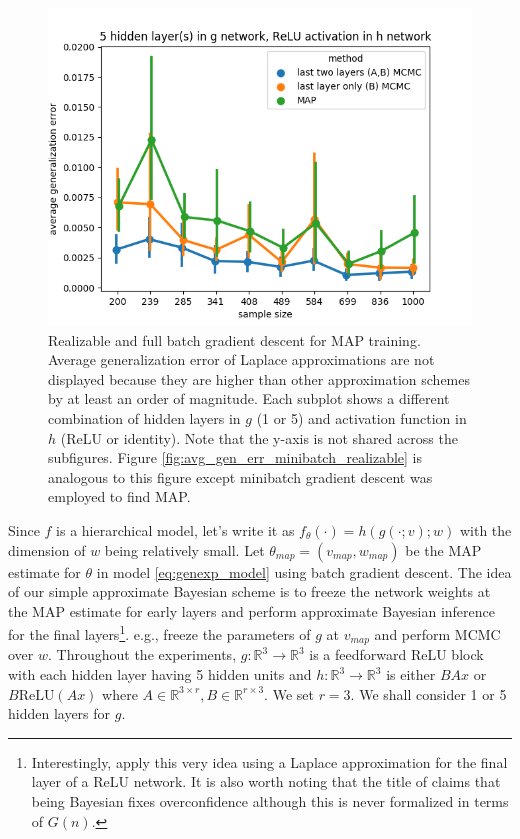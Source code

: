\documentclass{article} %
\begin{document}
\begin{figure}[h!]
\begin{center}
		\includegraphics[scale=0.4]{taskid11.png}
	\end{center}
	\caption{Realizable and full batch gradient descent for MAP training. Average generalization error of Laplace approximations are not displayed because they are higher than other approximation schemes by at least an order of magnitude. Each subplot shows a different combination of hidden layers in $g$ (1 or 5) and activation function in $h$ (ReLU or identity). Note that the y-axis is not shared across the subfigures. Figure \ref{fig:avg_gen_err_minibatch_realizable} is analogous to this figure except minibatch gradient descent was employed to find MAP.}
	\label{fig:avg_gen_err_fullbatch_realizable}
\end{figure}




 Since $f$ is a hierarchical model, let's write it as $f_\theta(\cdot) = h(g(\cdot;v);w)$ with the dimension of $w$ being relatively small. Let $\theta_{map} = (v_{map}, w_{map})$ be the MAP estimate for $\theta$ in model \ref{eq:genexp_model} using batch gradient descent. The idea of our simple approximate Bayesian scheme is to freeze the network weights at the MAP estimate for early layers and perform approximate Bayesian inference for the final layers\footnote{Interestingly, \citet{kristiadi_being_2020} apply this very idea using a Laplace approximation for the final layer of a ReLU network. It is also worth noting that the title of \citet{kristiadi_being_2020} claims that being Bayesian fixes overconfidence although this is never formalized in terms of $G(n)$.}. e.g., freeze the parameters of $g$ at $v_{map}$ and perform MCMC over $w$. 
Throughout the experiments, $g: \mathbb R^3 \to \mathbb R^3$ is a feedforward ReLU block with each hidden layer having 5 hidden units and $h: \mathbb R^3 \to \mathbb R^3$ is either $BAx$ or $B\text{ReLU}(Ax)$ where $A \in \mathbb R^{3 \times r}, B \in \mathbb R^{r \times 3}$. We set $r=3$. We shall consider 1 or 5 hidden layers for $g$. 
\end{document}
